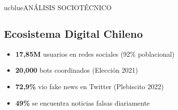 \begin{sectionbox}{ucblue}{ANÁLISIS SOCIOTÉCNICO}
\subsection*{\textbf{\textcolor{darktext}{Ecosistema Digital Chileno}}}
{\fontsize{20}{24}\selectfont
\begin{itemize}
    \setlength{\itemsep}{0.15cm}
    \item \textbf{17,85M} usuarios en redes sociales (92\% poblacional)
    \item \textbf{20,000} bots coordinados (Elección 2021)
    \item \textbf{72,9\%} vio fake news en Twitter (Plebiscito 2022)
    \item \textbf{49\%} se encuentra noticias falsas diariamente
\end{itemize}
}

\end{sectionbox}